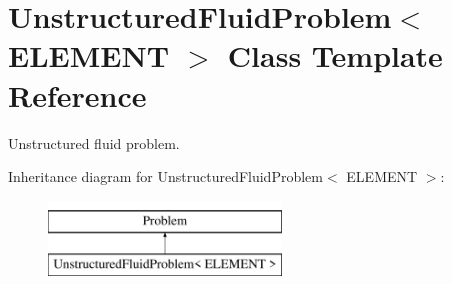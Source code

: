 \hypertarget{classUnstructuredFluidProblem}{}\section{Unstructured\+Fluid\+Problem$<$ E\+L\+E\+M\+E\+NT $>$ Class Template Reference}
\label{classUnstructuredFluidProblem}


Unstructured fluid problem.  


Inheritance diagram for Unstructured\+Fluid\+Problem$<$ E\+L\+E\+M\+E\+NT $>$\+:\begin{figure}[H]
\begin{center}
\leavevmode
\includegraphics[height=2.000000cm]{classUnstructuredFluidProblem}
\end{center}
\end{figure}
